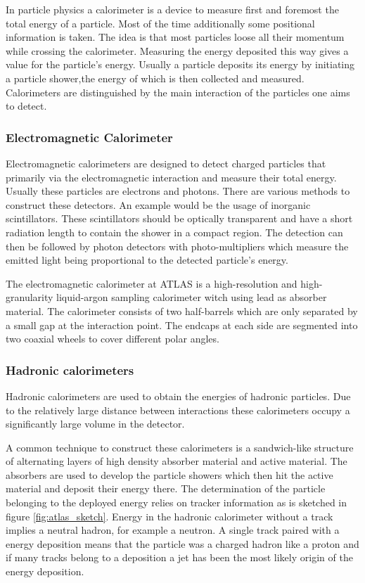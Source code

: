 In particle physics a calorimeter is a device to measure first and foremost the total energy of a particle. Most of the time additionally some positional information is taken.
The idea is that most particles loose all their momentum while crossing the calorimeter. Measuring the energy deposited this way gives a value for the particle's energy.
Usually a particle deposits its energy by initiating a particle shower,the energy of which is then collected and measured.
Calorimeters are distinguished by the main interaction of the particles one aims to detect. 
\subsubsection{Electromagnetic Calorimeter}

Electromagnetic calorimeters are designed to detect charged particles that primarily via the electromagnetic interaction and measure their total energy. Usually these particles are electrons and photons. There are various methods to construct these detectors. An example would be the usage of inorganic scintillators. These scintillators should be optically transparent and have a short radiation length to contain the shower in a compact region. The detection can then be followed by photon detectors with photo-multipliers which measure the emitted light being proportional to the detected particle's energy.

The electromagnetic calorimeter at ATLAS is a high-resolution and high-granularity liquid-argon sampling calorimeter witch using lead as absorber material. The calorimeter consists of two half-barrels which are only separated by a small gap at the interaction point. The endcaps at each side are segmented into two coaxial wheels to cover different polar angles.

\subsubsection{Hadronic calorimeters}

Hadronic calorimeters are used to obtain the energies of hadronic particles.
Due to the relatively large distance between interactions these calorimeters occupy a significantly large volume in the detector.

A common technique to construct these calorimeters is a sandwich-like structure of alternating layers of high density absorber material and active material. 
The absorbers are used to develop the particle showers which then hit the active material and deposit their energy there. The determination of the particle belonging to the deployed energy relies on tracker information as is sketched in figure \ref{fig:atlas_sketch}. Energy in the hadronic calorimeter without a track implies a neutral hadron, for example a neutron. A single track paired with a energy deposition means that the particle was a charged hadron like a proton and if many tracks belong to a deposition a jet has been the most likely origin of the energy deposition.


